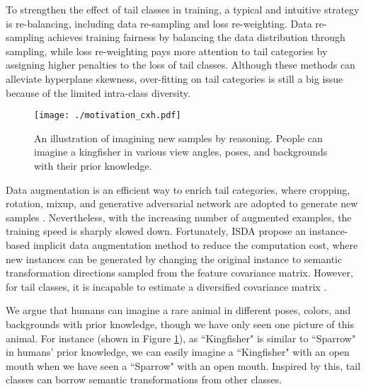 \documentclass[letterpaper]{article} \usepackage{aaai22}  \usepackage{times}  \usepackage{helvet}  \usepackage{courier}  \usepackage[hyphens]{url}  \usepackage{graphicx} \usepackage{bm}
\begin{document}
	To strengthen the effect of tail classes in training, a typical and intuitive strategy is re-balancing, including data re-sampling and loss re-weighting. Data re-sampling
	achieves training fairness by balancing the data distribution through sampling, while loss re-weighting pays more attention to tail categories by assigning higher penalties to the loss of tail classes. Although these methods can alleviate hyperplane skewness, over-fitting on tail categories is still a big issue because of the limited intra-class diversity. 
	
	\begin{figure}
		\setlength{\abovecaptionskip}{0pt}
\texttt{[image: ./motivation\_cxh.pdf]}
		\caption{An illustration of imagining new samples by reasoning.
			People can imagine a kingfisher in various view angles, poses, and backgrounds with their prior knowledge.  }
		\label{fig:EP}
	\end{figure}
	
	Data augmentation is an efficient way to enrich tail categories, where cropping, rotation, mixup, and generative adversarial network are adopted to generate new samples \cite{simonyan2014very,he2016deep,ratner2017learning,bowles2018gan}. Nevertheless, with the increasing number of augmented examples, the training speed is sharply slowed down. 
	Fortunately, ISDA \cite{wang2019implicit} propose an instance-based implicit data augmentation method to reduce the computation cost, where new instances can be generated by changing the original instance to semantic transformation directions sampled from the feature covariance matrix. However, for tail classes, it is incapable to estimate a diversified covariance matrix
	\cite{li2021metasaug}. 
	
	We argue that humans can imagine a rare animal in different poses, colors, and backgrounds with prior knowledge, though we have only seen one picture of this animal. For instance (shown in Figure \ref{fig:EP}), as ``Kingfisher" is similar to ``Sparrow" in humans' prior knowledge, we can easily imagine a ``Kingfisher" with an open mouth when we have seen a ``Sparrow" with an open mouth. Inspired by this, tail classes can borrow semantic transformations from other classes.
	
\end{document}
